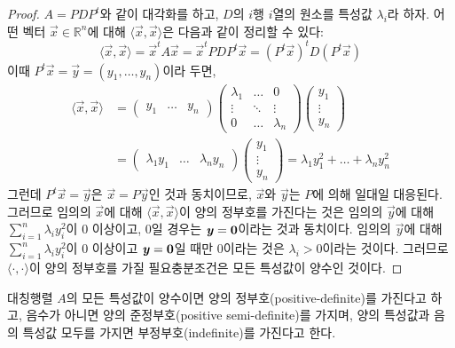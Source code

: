 \documentclass[../engineering_mathematics_lecture_note.tex]{subfiles}
\begin{document}
\begin{proof}
    $A = PDP^t$와 같이 대각화를 하고, $D$의 $i$행 $i$열의 원소를 특성값 $\lambda_i$라 하자.
    어떤 벡터 $\vec x \in \mathbb R^n$에 대해 $\langle \vec x, \vec x\rangle$은 다음과 같이 정리할 수 있다:
    \begin{equation*}
        \langle \vec x, \vec x\rangle = \vec x^t A \vec x = \vec x^t PDP^t \vec x = (P^t \vec x)^t D (P^t \vec x)
    \end{equation*}
    이때 $P^t \vec x = \vec y = (y_1, \dots, y_n)$이라 두면,
    \begin{align*}
        \langle \vec x, \vec x\rangle &=
        \begin{pmatrix}
            y_1 & \dots & y_n
        \end{pmatrix}
        \begin{pmatrix}
            \lambda_1 & \dots & 0\\
            \vdots & \ddots & \vdots\\
            0 & \dots & \lambda_n
        \end{pmatrix}
        \begin{pmatrix}
            y_1 \\ \vdots \\ y_n
        \end{pmatrix}\\
                                      &=
        \begin{pmatrix}
            \lambda_1 y_1 & \dots & \lambda_n y_n
        \end{pmatrix}
        \begin{pmatrix}
            y_1 \\ \vdots \\ y_n
        \end{pmatrix}
        = \lambda_1 y_1^2 + \dots + \lambda_n y_n^2
    \end{align*}
    그런데 $P^t \vec x = \vec y$은 $\vec x = P \vec y$인 것과 동치이므로, $\vec x$와 $\vec y$는 $P$에 의해 일대일 대응된다.
    그러므로 임의의 $\vec x$에 대해 $\langle \vec x, \vec x\rangle$이 양의 정부호를 가진다는 것은 임의의 $\vec y$에 대해 $\sum_{i = 1}^n \lambda_i y_i^2$이 0 이상이고, 0일 경우는 $\bm{\mathit{y}} = \bm{\mathrm{0}}$이라는 것과 동치이다.
    임의의 $\vec y$에 대해 $\sum_{i = 1}^n \lambda_i y_i^2$이 0 이상이고 $\bm{\mathit{y}} = \bm{\mathrm{0}}$일 때만 0이라는 것은 $\lambda_i > 0$이라는 것이다.
    그러므로 $\langle \cdot, \cdot \rangle$이 양의 정부호를 가질 필요충분조건은 모든 특성값이 양수인 것이다.
\end{proof}

\begin{definition}
    대칭행렬 $A$의 모든 특성값이 양수이면 양의 정부호(positive-definite)를 가진다고 하고, 음수가 아니면 양의 준정부호(positive semi-definite)를 가지며, 양의 특성값과 음의 특성값 모두를 가지면 부정부호(indefinite)를 가진다고 한다.
\end{definition}
\end{document}
